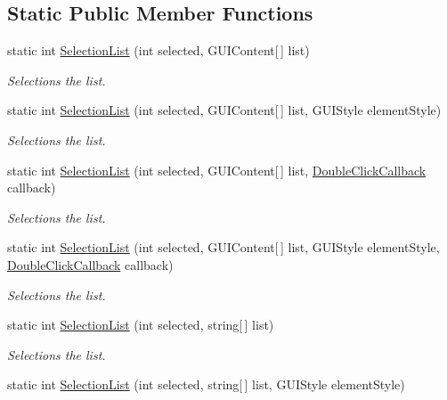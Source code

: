 \subsection*{Static Public Member Functions}
\begin{DoxyCompactItemize}
\item 
static int \hyperlink{class_g_u_i_layoutx_ad25129cd2a63a9b2d72f768711e5b09e}{Selection\+List} (int selected, G\+U\+I\+Content\mbox{[}$\,$\mbox{]} list)
\begin{DoxyCompactList}\small\item\em Selections the list. \end{DoxyCompactList}\item 
static int \hyperlink{class_g_u_i_layoutx_acf6b0ce4afa68d4dfeb3d467b51cf6d6}{Selection\+List} (int selected, G\+U\+I\+Content\mbox{[}$\,$\mbox{]} list, G\+U\+I\+Style element\+Style)
\begin{DoxyCompactList}\small\item\em Selections the list. \end{DoxyCompactList}\item 
static int \hyperlink{class_g_u_i_layoutx_a0486e17aae6ac685aef28b61147b2599}{Selection\+List} (int selected, G\+U\+I\+Content\mbox{[}$\,$\mbox{]} list, \hyperlink{class_g_u_i_layoutx_ad636807bfe6952505099a4c3be54080d}{Double\+Click\+Callback} callback)
\begin{DoxyCompactList}\small\item\em Selections the list. \end{DoxyCompactList}\item 
static int \hyperlink{class_g_u_i_layoutx_a49a3c8b55ec118415fe1417745fe24ce}{Selection\+List} (int selected, G\+U\+I\+Content\mbox{[}$\,$\mbox{]} list, G\+U\+I\+Style element\+Style, \hyperlink{class_g_u_i_layoutx_ad636807bfe6952505099a4c3be54080d}{Double\+Click\+Callback} callback)
\begin{DoxyCompactList}\small\item\em Selections the list. \end{DoxyCompactList}\item 
static int \hyperlink{class_g_u_i_layoutx_a80c9693ce79b3399df719eb0a863036c}{Selection\+List} (int selected, string\mbox{[}$\,$\mbox{]} list)
\begin{DoxyCompactList}\small\item\em Selections the list. \end{DoxyCompactList}\item 
static int \hyperlink{class_g_u_i_layoutx_a54af5b8182a348153cbaa9352715f2a5}{Selection\+List} (int selected, string\mbox{[}$\,$\mbox{]} list, G\+U\+I\+Style element\+Style)

\end{DoxyCompactItemize}
